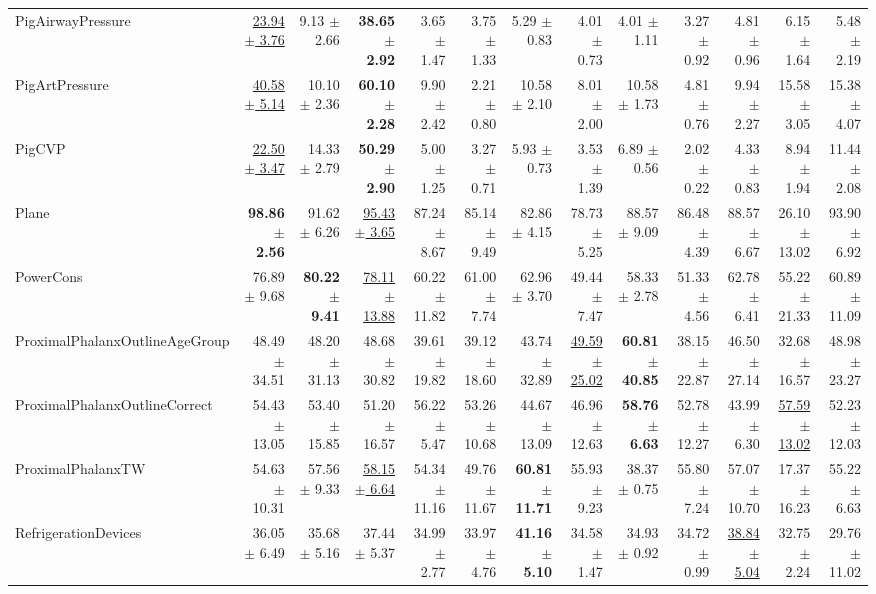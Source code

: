 \begin{landscape}
\begin{longtable}{lrrrrrrrrrrrr}
PigAirwayPressure & \underline{23.94 $\pm$ 3.76} & 9.13 $\pm$ 2.66 & \textbf{38.65 $\pm$ 2.92} & 3.65 $\pm$ 1.47 & 3.75 $\pm$ 1.33 & 5.29 $\pm$ 0.83 & 4.01 $\pm$ 0.73 & 4.01 $\pm$ 1.11 & 3.27 $\pm$ 0.92 & 4.81 $\pm$ 0.96 & 6.15 $\pm$ 1.64 & 5.48 $\pm$ 2.19 \\
PigArtPressure & \underline{40.58 $\pm$ 5.14} & 10.10 $\pm$ 2.36 & \textbf{60.10 $\pm$ 2.28} & 9.90 $\pm$ 2.42 & 2.21 $\pm$ 0.80 & 10.58 $\pm$ 2.10 & 8.01 $\pm$ 2.00 & 10.58 $\pm$ 1.73 & 4.81 $\pm$ 0.76 & 9.94 $\pm$ 2.27 & 15.58 $\pm$ 3.05 & 15.38 $\pm$ 4.07 \\
PigCVP & \underline{22.50 $\pm$ 3.47} & 14.33 $\pm$ 2.79 & \textbf{50.29 $\pm$ 2.90} & 5.00 $\pm$ 1.25 & 3.27 $\pm$ 0.71 & 5.93 $\pm$ 0.73 & 3.53 $\pm$ 1.39 & 6.89 $\pm$ 0.56 & 2.02 $\pm$ 0.22 & 4.33 $\pm$ 0.83 & 8.94 $\pm$ 1.94 & 11.44 $\pm$ 2.08 \\
Plane & \textbf{98.86 $\pm$ 2.56} & 91.62 $\pm$ 6.26 & \underline{95.43 $\pm$ 3.65} & 87.24 $\pm$ 8.67 & 85.14 $\pm$ 9.49 & 82.86 $\pm$ 4.15 & 78.73 $\pm$ 5.25 & 88.57 $\pm$ 9.09 & 86.48 $\pm$ 4.39 & 88.57 $\pm$ 6.67 & 26.10 $\pm$ 13.02 & 93.90 $\pm$ 6.92 \\
PowerCons & 76.89 $\pm$ 9.68 & \textbf{80.22 $\pm$ 9.41} & \underline{78.11 $\pm$ 13.88} & 60.22 $\pm$ 11.82 & 61.00 $\pm$ 7.74 & 62.96 $\pm$ 3.70 & 49.44 $\pm$ 7.47 & 58.33 $\pm$ 2.78 & 51.33 $\pm$ 4.56 & 62.78 $\pm$ 6.41 & 55.22 $\pm$ 21.33 & 60.89 $\pm$ 11.09 \\
ProximalPhalanxOutlineAgeGroup & 48.49 $\pm$ 34.51 & 48.20 $\pm$ 31.13 & 48.68 $\pm$ 30.82 & 39.61 $\pm$ 19.82 & 39.12 $\pm$ 18.60 & 43.74 $\pm$ 32.89 & \underline{49.59 $\pm$ 25.02} & \textbf{60.81 $\pm$ 40.85} & 38.15 $\pm$ 22.87 & 46.50 $\pm$ 27.14 & 32.68 $\pm$ 16.57 & 48.98 $\pm$ 23.27 \\
ProximalPhalanxOutlineCorrect & 54.43 $\pm$ 13.05 & 53.40 $\pm$ 15.85 & 51.20 $\pm$ 16.57 & 56.22 $\pm$ 5.47 & 53.26 $\pm$ 10.68 & 44.67 $\pm$ 13.09 & 46.96 $\pm$ 12.63 & \textbf{58.76 $\pm$ 6.63} & 52.78 $\pm$ 12.27 & 43.99 $\pm$ 6.30 & \underline{57.59 $\pm$ 13.02} & 52.23 $\pm$ 12.03 \\
ProximalPhalanxTW & 54.63 $\pm$ 10.31 & 57.56 $\pm$ 9.33 & \underline{58.15 $\pm$ 6.64} & 54.34 $\pm$ 11.16 & 49.76 $\pm$ 11.67 & \textbf{60.81 $\pm$ 11.71} & 55.93 $\pm$ 9.23 & 38.37 $\pm$ 0.75 & 55.80 $\pm$ 7.24 & 57.07 $\pm$ 10.70 & 17.37 $\pm$ 16.23 & 55.22 $\pm$ 6.63 \\
RefrigerationDevices & 36.05 $\pm$ 6.49 & 35.68 $\pm$ 5.16 & 37.44 $\pm$ 5.37 & 34.99 $\pm$ 2.77 & 33.97 $\pm$ 4.76 & \textbf{41.16 $\pm$ 5.10} & 34.58 $\pm$ 1.47 & 34.93 $\pm$ 0.92 & 34.72 $\pm$ 0.99 & \underline{38.84 $\pm$ 5.04} & 32.75 $\pm$ 2.24 & 29.76 $\pm$ 11.02 \\

\end{longtable}
\end{landscape}
